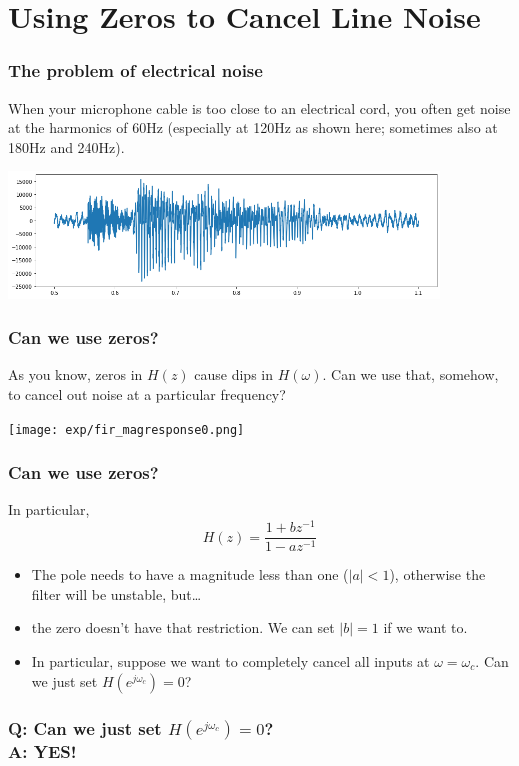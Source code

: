 \documentclass{beamer}
\begin{document}
\section[Line Noise]{Using Zeros to Cancel Line Noise}
\setcounter{subsection}{1}

\begin{frame}
  \frametitle{The problem of electrical noise}

  When your microphone cable is too close to an electrical cord, you
  often get noise at the harmonics of 60Hz (especially at 120Hz as
  shown here; sometimes also at 180Hz and 240Hz).
  \centerline{\includegraphics[width=4.5in]{waveform_with_120hz.png}}
\end{frame}

\begin{frame}
  \frametitle{Can we use zeros?}

  As you know, zeros in $H(z)$ cause dips in $H(\omega)$.  Can we use that, somehow,
  to cancel out noise at a particular frequency?
  \centerline{\texttt{[image: exp/fir\_magresponse0.png]}}
\end{frame}

\begin{frame}
  \frametitle{Can we use zeros?}

  In particular,
  \[
  H(z)  = \frac{1+bz^{-1}}{1-az^{-1}}
  \]
  \begin{itemize}
  \item The pole needs to have a magnitude less than one ($|a|<1$),
    otherwise the filter will be unstable, but\ldots
  \item the zero doesn't have that restriction.  We can set $|b|=1$ if we want to.
  \item In particular, suppose we want to completely cancel all inputs
    at $\omega=\omega_c$.  Can we just set $H(e^{j\omega_c})=0$?
  \end{itemize}
\end{frame}

\begin{frame}
  \frametitle{{\bf Q}: Can we just set $H(e^{j\omega_c})=0$?\\{\bf A: YES!}}
  \centerline{}
\end{frame}  
\end{document}
